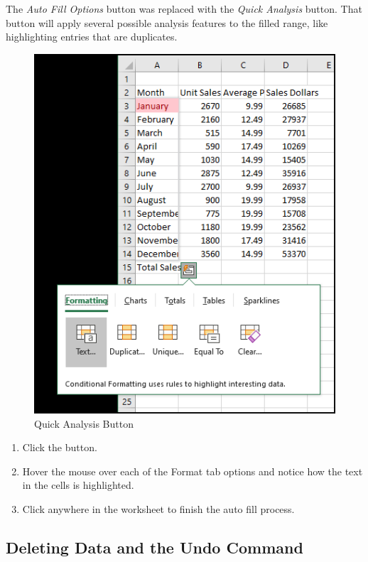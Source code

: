  The \textit{Auto Fill Options} button was replaced with the \textit{Quick Analysis} button. That button will apply several possible analysis features to the filled range, like highlighting entries that are duplicates.

\begin{figure}[H]
	\centering
	\includegraphics[width=\maxwidth{.95\linewidth}]{gfx/ch01_fig20a}
	\caption{Quick Analysis Button}
	\label{01:fig20a}
\end{figure}

\begin{enumbox}
	\begin{enumerate}
		\item Click the  button.
		\item Hover the mouse over each of the Format tab options and notice how the text in the cells is highlighted.
		\item Click anywhere in the worksheet to finish the auto fill process.
	\end{enumerate}
\end{enumbox}

\subsection{Deleting Data and the Undo Command}

